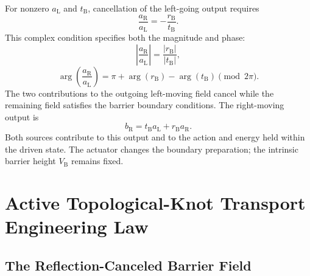 For nonzero $a_{\mathrm L}$ and $t_{\mathrm B}$, cancellation of the left-going output requires
\begin{equation}
    \boxed{
    \frac{a_{\mathrm R}}{a_{\mathrm L}}
    =-\frac{r_{\mathrm B}}{t_{\mathrm B}}
    }.
    \label{eq:tunneling_reflection_cancellation}
\end{equation}
This complex condition specifies both the magnitude and phase:
\begin{equation}
    \left|\frac{a_{\mathrm R}}{a_{\mathrm L}}\right|
    =\frac{|r_{\mathrm B}|}{|t_{\mathrm B}|},
    \label{eq:tunneling_drive_amplitude_condition}
\end{equation}
\begin{equation}
    \arg\!\left(\frac{a_{\mathrm R}}{a_{\mathrm L}}\right)
    =\pi+\arg(r_{\mathrm B})-\arg(t_{\mathrm B})
    \pmod{2\pi}.
    \label{eq:tunneling_drive_phase_condition}
\end{equation}
The two contributions to the outgoing left-moving field cancel while the remaining field satisfies the barrier boundary conditions. The right-moving output is
\begin{equation}
    b_{\mathrm R}
    =t_{\mathrm B}a_{\mathrm L}+r_{\mathrm B}a_{\mathrm R}.
    \label{eq:tunneling_active_right_output}
\end{equation}
Both sources contribute to this output and to the action and energy held within the driven state. The actuator changes the boundary preparation; the intrinsic barrier height $V_{\mathrm B}$ remains fixed.

\section{Active Topological-Knot Transport Engineering Law}
\label{sec:tunneling_active_knot_transport}

\subsection{The Reflection-Canceled Barrier Field}

